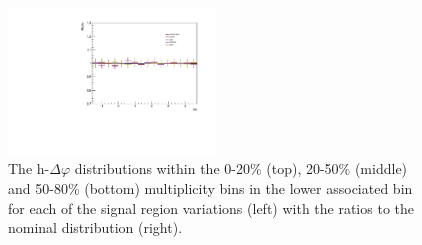 \begin{figure}[ht]
    \includegraphics[width=0.49\textwidth]{figures/analysis/signal_variations_dphi_50_80_lowpt_ratio.pdf}
    \caption{The h-\lmb $\Delta\varphi$ distributions within the 0-20\% (top), 20-50\% (middle) and 50-80\% (bottom) multiplicity bins in the lower associated \pt bin for each of the signal region variations (left) with the ratios to the nominal distribution (right).}
    \label{fig:signal_region_variations_lowpt}
\end{figure}

